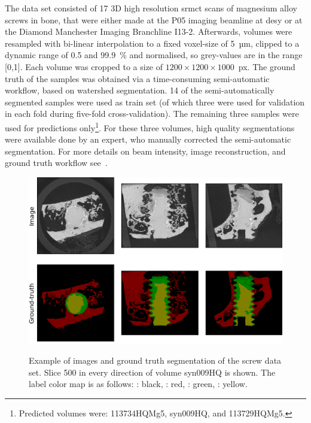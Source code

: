 The data set consisted of 17 3D high resolution \gls{srmct} scans of magnesium alloy screws in bone, that were either made at the P05 imaging beamline at \gls{desy} or at the Diamond Manchester Imaging Branchline I13-2.
Afterwards, volumes were resampled with bi-linear interpolation to a fixed voxel-size of 5~µm, clipped to a dynamic range of 0.5 and 99.9~\% and normalised, so grey-values are in the range [0,1].
Each volume was cropped to a size of $1200 \times 1200 \times 1000$~px.
The ground truth of the samples was obtained via a time-consuming semi-automatic workflow, based on watershed segmentation.
14 of the semi-automatically segmented samples were used as train set (of which three were used for validation in each fold during five-fold cross-validation).
The remaining three samples were used for predictions only\footnote{Predicted volumes were: 113734HQMg5, syn009HQ, and 113729HQMg5.}.
For these three volumes, high quality segmentations were available done by an expert, who manually corrected the semi-automatic segmentation.
For more details on beam intensity, image reconstruction, and ground truth workflow see~\autocite{Baltruschat2021}.

\begin{figure}[!htb]
    \centering
    \includegraphics[width=\textwidth]{pictures/ExampleImageGroundtruth_syn009_slice500_allDirections}\\
    \caption[Example Images of Screws Data Set]{Example of images and ground truth segmentation of the screw data set. Slice 500 in every direction of volume syn009HQ is shown. The label color map is as follows: : black, : red, : green, : yellow.}
    \label{fig:screws-example}
\end{figure}

